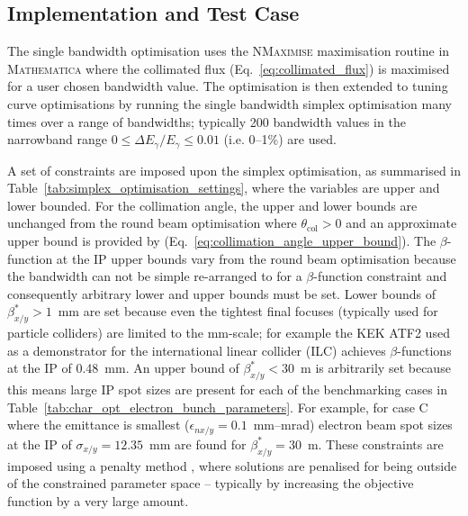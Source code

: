 \documentclass[../main.tex]{subfiles}
\begin{document}
\subsection{Implementation and Test Case}

The single bandwidth optimisation uses the \textsc{NMaximise} maximisation routine in \textsc{Mathematica} \cite{wolfram2021nmaximize} where the collimated flux (Eq.~\ref{eq:collimated_flux}) is maximised for a user chosen bandwidth value. The optimisation is then extended to tuning curve optimisations by running the single bandwidth simplex optimisation many times over a range of bandwidths; typically 200 bandwidth values in the narrowband range $0 \leq \Delta E_{\gamma}/E_{\gamma} \leq 0.01$ (i.e. 0--1\%) are used.   

A set of constraints are imposed upon the simplex optimisation, as summarised in Table~\ref{tab:simplex_optimisation_settings}, where the variables are upper and lower bounded. For the collimation angle, the upper and lower bounds are unchanged from the round beam optimisation where $\theta_{\mathrm{col}} > 0$ and an approximate upper bound is provided by (Eq.~\ref{eq:collimation_angle_upper_bound}). The $\beta$-function at the IP upper bounds vary from the round beam optimisation because the bandwidth can not be simple re-arranged to for a $\beta$-function constraint and consequently arbitrary lower and upper bounds must be set. Lower bounds of $\beta_{x/y}^{*} > 1$~\si{\milli\meter} are set because even the tightest final focuses (typically used for particle colliders) are limited to the \si{\milli\meter}-scale; for example the KEK ATF2 \cite{okugi2016achievement} used as a demonstrator for the international linear collider (ILC) \cite{yamamoto2021international} achieves $\beta$-functions at the IP of 0.48~\si{\milli\meter}. An upper bound of $\beta_{x/y}^{*} < 30$~\si{\meter} is arbitrarily set because this means large IP spot sizes are present for each of the benchmarking cases in Table~\ref{tab:char_opt_electron_bunch_parameters}. For example, for case C where the emittance is smallest ($\epsilon_{nx/y} = 0.1$~\si{\milli\meter}--\si{\milli\radian}) electron beam spot sizes at the IP of $\sigma_{x/y} = 12.35$~\si{\milli\meter} are found for $\beta_{x/y}^{*} = 30$~\si{\meter}. These constraints are imposed using a penalty method \cite{myers1973response}, where solutions are penalised for being outside of the constrained parameter space -- typically by increasing the objective function by a very large amount.  
\end{document}
